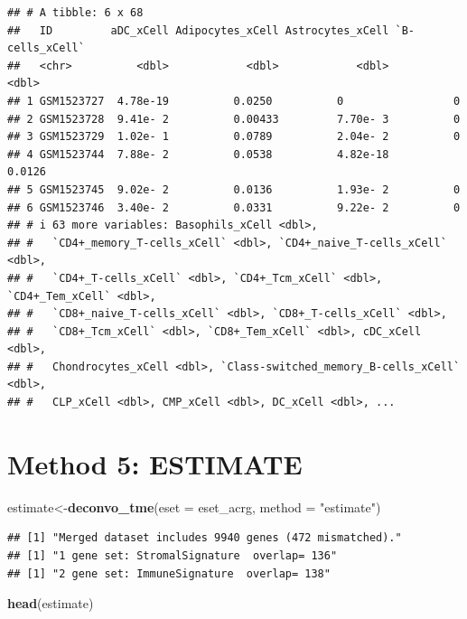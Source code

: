 \documentclass[
  12pt,
]{book}
\newenvironment{Shaded}{\begin{snugshade}}{\end{snugshade}}
\newcommand{\AttributeTok}[1]{\textcolor[rgb]{0.13,0.29,0.53}{#1}}
\newcommand{\FunctionTok}[1]{\textcolor[rgb]{0.13,0.29,0.53}{\textbf{#1}}}
\newcommand{\NormalTok}[1]{#1}
\newcommand{\OtherTok}[1]{\textcolor[rgb]{0.56,0.35,0.01}{#1}}
\newcommand{\StringTok}[1]{\textcolor[rgb]{0.31,0.60,0.02}{#1}}
\theoremstyle{definition}
\theoremstyle{definition}
\theoremstyle{definition}
\theoremstyle{definition}
\theoremstyle{remark}
\begin{document}
\begin{verbatim}
## # A tibble: 6 x 68
##   ID         aDC_xCell Adipocytes_xCell Astrocytes_xCell `B-cells_xCell`
##   <chr>          <dbl>            <dbl>            <dbl>           <dbl>
## 1 GSM1523727  4.78e-19          0.0250          0                 0     
## 2 GSM1523728  9.41e- 2          0.00433         7.70e- 3          0     
## 3 GSM1523729  1.02e- 1          0.0789          2.04e- 2          0     
## 4 GSM1523744  7.88e- 2          0.0538          4.82e-18          0.0126
## 5 GSM1523745  9.02e- 2          0.0136          1.93e- 2          0     
## 6 GSM1523746  3.40e- 2          0.0331          9.22e- 2          0     
## # i 63 more variables: Basophils_xCell <dbl>,
## #   `CD4+_memory_T-cells_xCell` <dbl>, `CD4+_naive_T-cells_xCell` <dbl>,
## #   `CD4+_T-cells_xCell` <dbl>, `CD4+_Tcm_xCell` <dbl>, `CD4+_Tem_xCell` <dbl>,
## #   `CD8+_naive_T-cells_xCell` <dbl>, `CD8+_T-cells_xCell` <dbl>,
## #   `CD8+_Tcm_xCell` <dbl>, `CD8+_Tem_xCell` <dbl>, cDC_xCell <dbl>,
## #   Chondrocytes_xCell <dbl>, `Class-switched_memory_B-cells_xCell` <dbl>,
## #   CLP_xCell <dbl>, CMP_xCell <dbl>, DC_xCell <dbl>, ...
\end{verbatim}

\hypertarget{method-5-estimate}{%
\section{Method 5: ESTIMATE}\label{method-5-estimate}}

\begin{Shaded}
\begin{Highlighting}[]
\NormalTok{estimate}\OtherTok{\textless{}{-}}\FunctionTok{deconvo\_tme}\NormalTok{(}\AttributeTok{eset =}\NormalTok{ eset\_acrg, }\AttributeTok{method =} \StringTok{"estimate"}\NormalTok{)}
\end{Highlighting}
\end{Shaded}

\begin{verbatim}
## [1] "Merged dataset includes 9940 genes (472 mismatched)."
## [1] "1 gene set: StromalSignature  overlap= 136"
## [1] "2 gene set: ImmuneSignature  overlap= 138"
\end{verbatim}

\begin{Shaded}
\begin{Highlighting}[]
\FunctionTok{head}\NormalTok{(estimate)}
\end{Highlighting}
\end{Shaded}
\end{document}
